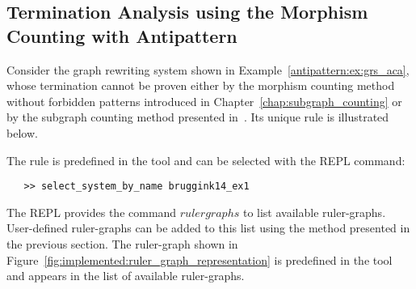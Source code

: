 \subsection{Termination Analysis using the Morphism Counting with Antipattern}
Consider the graph rewriting system shown in Example~\ref{antipattern:ex:grs_aca}, whose termination cannot be proven either by the morphism counting method without forbidden patterns introduced in Chapter~\ref{chap:subgraph_counting} or by the subgraph counting method presented in~\cite{overbeek2024termination_lmcs}. Its unique rule is illustrated below.
\begin{center}
\end{center}
The rule is predefined in the tool and can be selected with the REPL command:
 \begin{verbatim}
   >> select_system_by_name bruggink14_ex1
 \end{verbatim}
The REPL provides the command \colorbox{Ivory2}{$rulergraphs$} to list available ruler-graphs. User-defined ruler-graphs can be added to this list using the method presented in the previous section. The ruler-graph shown in Figure~\ref{fig:implemented:ruler_graph_representation} is predefined in the tool and appears in the list of available ruler-graphs.


